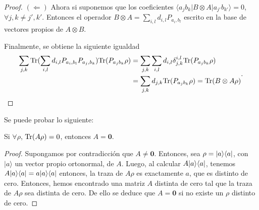 \documentclass[12pt,oneside]{book}\raggedbottom{}
\begin{document}
\begin{proof}

\begin{comment}
	Ejemplo: Sea $Q=c_{0+}|0+\rala 0+|+c_{0-}|0-\rala 0-|+ c_{1+}|1+\rala 1+|+c_{1-}|1-\rala 1-|$ y 


$SQS=c_{0+}|+0\rala +0|+c_{0-}|-0\rala -0|+ c_{1+}|+1\rala +1|+c_{1-}|-1\rala -1|$ pero también supongamos que \[SQS=\sum_{j,k}\tr(SQS P_{d_{jk}})P_{d_{j,k}}\]

donde $\tr(SQS|0+\rala0+|)=\frac{1}{4}(c_{0+}+c_{0-}+c_{1+}+c_{1-})$




\end{comment}















$(\Leftarrow)$
Ahora si suponemos que los coeficientes  $\langle a_j b_k |B\otimes A|a_{j'}b_{k'}\rangle=0$,  $\forall j,k\ne j',k'$. Entonces el operador $B\otimes A=\sum_{i,l}d_{i,l}P_{a_i, b_l}$ escrito en la base de vectores propios de $A\otimes B$.

Finalmente, se obtiene la siguiente igualdad \[\begin{split}\sum_{j,k}{\rm Tr}( \sum_{i,l}d_{i,l}P_{a_i, b_l} P_{a_j,b_k}){\rm Tr}(P_{a_j b_k}\rho )&=\sum_{j,k}\sum_{i,l}d_{i,l}\delta_{j,k}^{i,l}{\rm Tr}(P_{a_j b_k}\rho )\\&=\sum_{j,k}d_{j,k}{\rm Tr}(P_{a_j b_k}\rho )={\rm Tr}(B\otimes A\rho)\end{split}.\]


\end{proof}

Se puede probar lo siguiente:


\begin{lemma}\label{lemma_traza_cero} Si $\forall\rho$, ${\rm Tr}(A\rho)=0$, entonces $A=\mathbf{0}$.\end{lemma}\begin{proof} Supongamos por contradicción que $A\ne \mathbf{0}$. Entonces, sea $\rho=|a\rangle \langle a|$, con $|a\rangle$ un vector propio ortonormal, de $A$. Luego, al calcular $A|a\rangle \langle a|$, tenemos $A|a\rangle \langle a|=a|a\rangle \langle a|$ entonces, la traza  de $A\rho$ es exactamente $a$, que es distinto de cero.
Entonces, hemos encontrado una matriz $A$ distinta de cero tal que la traza de $A\rho$ sea distinta de cero. De ello se deduce que $A = \mathbf{0}$ si no existe un $\rho$ distinto de cero. \end{proof}
\end{document}
